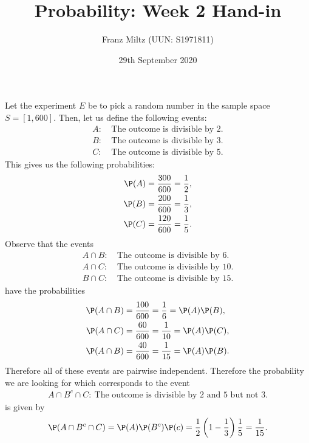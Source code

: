 \documentclass{article}
\begin{document}
\title{Probability: Week 2 Hand-in}
\author{Franz Miltz (UUN: S1971811)}
\date{29th September 2020}
\maketitle
\noindent Let the experiment $E$ be to pick a random number in the sample space
$S=[1,600]$. Then, let us define the following events:
\begin{align*}
	A:\: & \text{The outcome is divisible by 2.} \\
	B:\: & \text{The outcome is divisible by 3.} \\
	C:\: & \text{The outcome is divisible by 5.}
\end{align*}
This gives us the following probabilities:
\begin{align*}
	\P(A)=\frac{300}{600}=\frac{1}{2}, \\
	\P(B)=\frac{200}{600}=\frac{1}{3}, \\
	\P(C)=\frac{120}{600}=\frac{1}{5}.
\end{align*}
Observe that the events
\begin{align*}
	A\cap B:\: & \text{The outcome is divisible by 6.}  \\
	A\cap C:\: & \text{The outcome is divisible by 10.} \\
	B\cap C:\: & \text{The outcome is divisible by 15.}
\end{align*}
have the probabilities
\begin{align*}
	\P(A\cap B) & =\frac{100}{600}=\frac{1}{6}=\P(A)\P(B), \\
	\P(A\cap C) & =\frac{60}{600}=\frac{1}{10}=\P(A)\P(C), \\
	\P(A\cap B) & =\frac{40}{600}=\frac{1}{15}=\P(A)\P(B).
\end{align*}
Therefore all of these events are pairwise independent. Therefore the
probability we are looking for which corresponds to the event
\begin{align*}
	A\cap B^c \cap C:\:\text{The outcome is divisible by 2 and 5 but not 3.}
\end{align*}
is given by
\begin{align*}
	\P(A\cap B^c\cap C)= \P(A)\P(B^c)\P(c) = \frac{1}{2}\left(1-\frac{1}{3}\right)\frac{1}{5}=\frac{1}{15}.
\end{align*}
\end{document}
